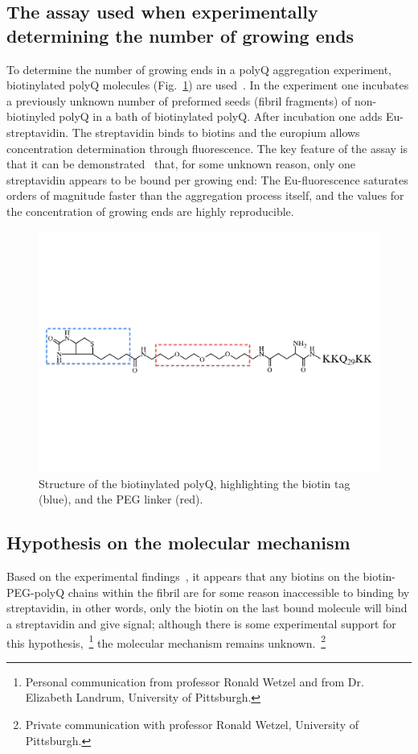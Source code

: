 \documentclass[a4paper,11pt,floatfix,authordate1-4,twocolumn]{revtex4-1}
\begin{document}
\subsection{The assay used when experimentally determining the number of growing ends}
To determine the number of growing ends in a polyQ aggregation experiment,
biotinylated polyQ molecules (Fig.~\ref{Fig:sketch}) are used~\cite{bhattacharyya:2005a,onuallain:2006a}.
%
In the experiment one incubates a previously unknown number of preformed seeds (fibril fragments)
of non-biotinyled polyQ in a bath of biotinylated polyQ.
%
After incubation one adds Eu-streptavidin.
The streptavidin binds to biotins and
the europium allows concentration determination through fluorescence.
%
The key feature of the assay is that it can be demonstrated~\cite{onuallain:2006a}
that, for some unknown reason, only one streptavidin appears to be bound per growing end:
The Eu-fluorescence saturates orders of magnitude faster than the aggregation
process itself, and the values for the concentration of growing ends
are highly reproducible.
%
\begin{figure}[!htb]
\centering
\includegraphics[width=\columnwidth]{../Figs/biotinylatedPolyQ_2.pdf}
\caption{\label{Fig:sketch}\footnotesize
Structure of the biotinylated polyQ,
highlighting the biotin tag (blue), and
the PEG linker (red).
}
\end{figure}


\subsection{Hypothesis on the molecular mechanism}
Based on the experimental findings~\cite{bhattacharyya:2005a,onuallain:2006a}, it appears that
any biotins on the biotin-PEG-polyQ chains within the fibril are for some reason inaccessible to binding by streptavidin,
in other words, only the biotin on the last bound molecule will bind a streptavidin and give signal;
although there is some experimental support for this hypothesis,~\footnote{
Personal communication from professor Ronald Wetzel
and from Dr. Elizabeth Landrum, University of Pittsburgh.
}
the molecular mechanism remains unknown.~\footnote{
Private communication with professor Ronald Wetzel, University of Pittsburgh.
}
%
\end{document}
